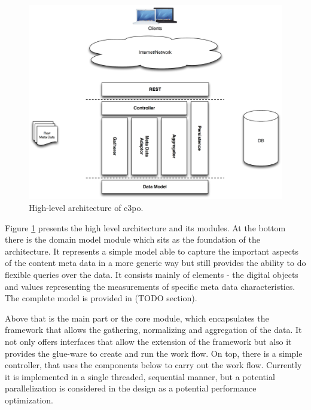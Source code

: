 \begin{figure}[htb]
\begin{center}
\includegraphics[width=5in]{figures/architecture/c3po_highlevel_architecture.png}
\caption{High-level architecture of c3po.}
\label{fig:architecture_highlevel}
\end{center}
\end{figure}

Figure \ref{fig:architecture_highlevel} presents the high level architecture and its modules. At the bottom there is the domain model module which sits as the foundation of the architecture. It represents a simple model able to capture the important aspects of the content meta data in a more generic way but still provides the ability to do flexible queries over the data. It consists mainly of elements - the digital objects and values representing the measurements of specific meta data characteristics. The complete model is provided in (TODO section).

Above that is the main part or the core module, which encapsulates the framework that allows the gathering, normalizing and aggregation of the data. It not only offers interfaces that allow the extension of the framework but also it provides the glue-ware to create and run the work flow.
On top, there is a simple controller, that uses the components below to carry out the work flow. Currently it is implemented in a single threaded, sequential manner, but a potential parallelization is considered in the design as a potential performance optimization.

